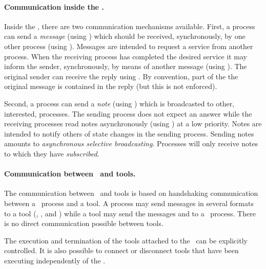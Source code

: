 \documentclass[twoside]{article} %
\begin{document}
\paragraph{Communication inside the \TB.}
Inside the \TB, there are two communication mechanisms available.
First, a process can send a {\em message} (using ) which
should be received, synchronously, by one other process (using
). Messages are intended to request a service from another
process. When the receiving process has completed the desired service
it may inform the sender, synchronously, by means of another message (using
). The original sender can receive the reply using
.  By convention, part of the the original message is contained
in the reply (but this is not enforced).

Second, a process can send a {\em note} (using ) which is
broadcasted to other, interested, processes. The sending process does
not expect an answer while the receiving processes read notes
asynchronously (using ) at a low priority. Notes are
intended to notify others of state changes in the sending process.
Sending notes amounts to {\em asynchronous selective broadcasting}.
Processes will only receive notes to which they have {\em subscribed}.

\paragraph{Communication between \TB\ and tools.}
The communication between \TB\ and tools is based on handshaking
communication between a \TB\ process and a tool.  A process may send
messages in several formats to a tool (, ,
and ) while a tool may send the messages 
and  to a \TB\ process.  There is no direct communication
possible between tools.

The execution and termination of the tools attached to the \TB\ can be
explicitly controlled. It is also possible to connect or disconnect
tools that have been executing independently of the \TB.
\end{document}
